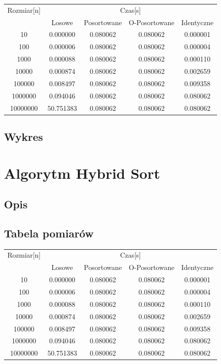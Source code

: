 \documentclass[12pt]{article}
\begin{document}
\begin{center}
\begin{tabular}{ccccc} 
\\ 
\toprule
Rozmiar[n] & \multicolumn{4}{c}{Czas[s]} \\
\cmidrule(r){2-5}
 & Losowe & Posortowane & O-Posortowane & Identyczne \\
\midrule
10       & 0.000000   & 0.080062 & 0.080062  & 0.000001 \\
100      & 0.000006   & 0.080062 & 0.080062  & 0.000004 \\
1000     & 0.000088   & 0.080062 & 0.080062  & 0.000110 \\
10000    & 0.000874   & 0.080062 & 0.080062  & 0.002659 \\
100000   & 0.008497   & 0.080062 & 0.080062  & 0.009358 \\
1000000  & 0.094046   & 0.080062 & 0.080062  & 0.080062 \\
10000000 & 50.751383  & 0.080062 & 0.080062  & 0.080062 \\
\bottomrule
\end{tabular}
\end{center}

\subsection{Wykres}

\section{Algorytm Hybrid Sort }
\subsection{Opis}
\subsection{Tabela pomiarów}

\begin{center}
\begin{tabular}{ccccc}  
\\
\toprule
Rozmiar[n] & \multicolumn{4}{c}{Czas[s]} \\
\cmidrule(r){2-5}
 & Losowe & Posortowane & O-Posortowane & Identyczne \\
\midrule
10       & 0.000000   & 0.080062 & 0.080062  & 0.000001 \\
100      & 0.000006   & 0.080062 & 0.080062  & 0.000004 \\
1000     & 0.000088   & 0.080062 & 0.080062  & 0.000110 \\
10000    & 0.000874   & 0.080062 & 0.080062  & 0.002659 \\
100000   & 0.008497   & 0.080062 & 0.080062  & 0.009358 \\
1000000  & 0.094046   & 0.080062 & 0.080062  & 0.080062 \\
10000000 & 50.751383  & 0.080062 & 0.080062  & 0.080062 \\
\bottomrule
\end{tabular}
\end{center}
\end{document}
